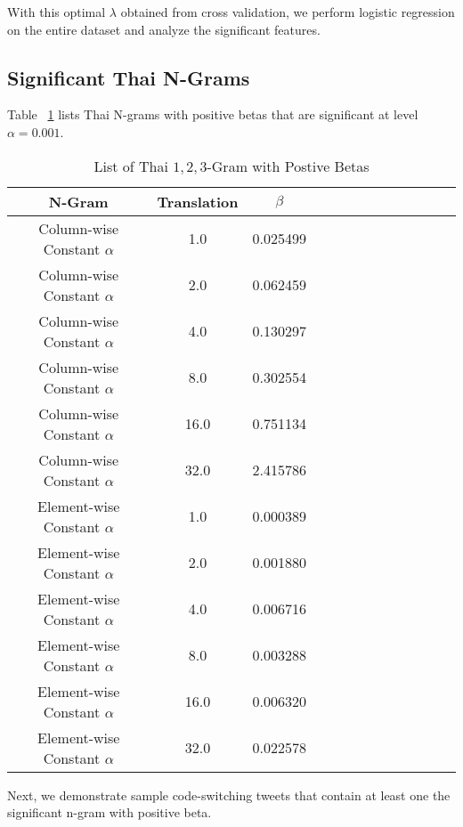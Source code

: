 \documentclass[conference]{IEEEtran}
\begin{document}
With this optimal $\lambda$ obtained from cross validation, we perform logistic regression on the entire dataset and analyze the significant features. 





\subsection{Significant Thai N-Grams}
Table ~\ref{tab:significantNgram} lists Thai N-grams with positive betas that are significant at level $\alpha = 0.001$.

\begin{table}[h!] 
 \caption{List of Thai $1,2,3$-Gram with Postive Betas}
\centering %
\begin{tabular}{c c c c c c rrrrrrr} %
\hline\hline %
N-Gram		&	Translation	& 	$\beta$	
\\ [0.5ex] 
\hline 
Column-wise Constant $\alpha$  	&	1.0 & 	 0.025499 	 \\ 
Column-wise Constant $\alpha$  	&	2.0 & 	 0.062459 	 \\ 
Column-wise Constant $\alpha$  	&	4.0 & 	 0.130297 	 \\ 
Column-wise Constant $\alpha$  	&	8.0 & 	 0.302554 	 \\
Column-wise Constant $\alpha$  	&	16.0 & 	 0.751134 	 	\\
Column-wise Constant $\alpha$  	&	32.0 & 	 2.415786 	 \\
Element-wise Constant $\alpha$  	&	1.0 & 	 0.000389 	 \\
Element-wise Constant $\alpha$  	&	2.0 & 	 0.001880 	 \\
Element-wise Constant $\alpha$  	&	4.0 & 	 0.006716 	 \\
Element-wise Constant $\alpha$  	&	8.0 & 	 0.003288 	 \\
Element-wise Constant $\alpha$  	&	16.0 & 	 0.006320 	 \\ 
Element-wise Constant $\alpha$  	&	32.0 & 	 0.022578 	 \\ 
\hline %
\end{tabular} 
\label{tab:significantNgram} 
\end{table} 

Next, we demonstrate sample code-switching tweets that contain at least one the significant n-gram with positive beta. 
\end{document}
